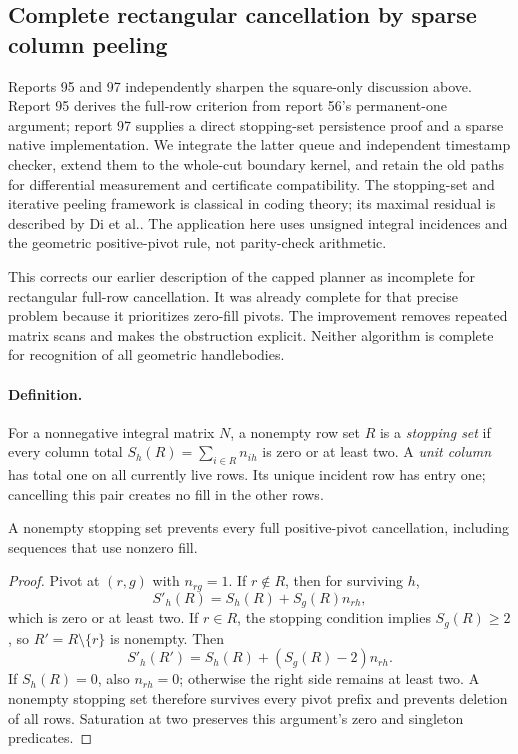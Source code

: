 \subsection{Complete rectangular cancellation by sparse column peeling}
\label{marked-cut:column-peeling}

Reports 95 and 97 independently sharpen the square-only discussion above.
Report 95 derives the full-row criterion from report 56's permanent-one
argument; report 97 supplies a direct stopping-set persistence proof and a
sparse native implementation. We integrate the latter queue and independent
timestamp checker, extend them to the whole-cut boundary kernel, and retain
the old paths for differential measurement and certificate compatibility.
The stopping-set and iterative peeling framework is classical in coding
theory; its maximal residual is described by Di et al.\cite{dptru2002}.
The application here uses unsigned integral incidences and the geometric
positive-pivot rule, not parity-check arithmetic.

This corrects our earlier description of the capped planner as incomplete
for rectangular full-row cancellation. It was already complete for that
precise problem because it prioritizes zero-fill pivots. The improvement
removes repeated matrix scans and makes the obstruction explicit. Neither
algorithm is complete for recognition of all geometric handlebodies.

\paragraph{Definition.}
For a nonnegative integral matrix $N$, a nonempty row set $R$ is a
\emph{stopping set} if every column total
$S_h(R)=\sum_{i\in R}n_{ih}$ is zero or at least two.
A \emph{unit column} has total one on all currently live rows.
Its unique incident row has entry one; cancelling this pair creates no fill
in the other rows.


\begin{proposition}
\label{marked-cut:stopping-persistence}
A nonempty stopping set prevents every full positive-pivot cancellation,
including sequences that use nonzero fill.
\end{proposition}
\begin{proof}
Pivot at $(r,g)$ with $n_{rg}=1$. If $r\notin R$, then for surviving $h$,
\[
 S'_h(R)=S_h(R)+S_g(R)n_{rh},
\]
which is zero or at least two. If $r\in R$, the stopping condition implies
$S_g(R)\ge2$, so $R'=R\setminus\{r\}$ is nonempty. Then
\[
 S'_h(R')=S_h(R)+(S_g(R)-2)n_{rh}.
\]
If $S_h(R)=0$, also $n_{rh}=0$; otherwise the right side remains at least
two. A nonempty stopping set therefore survives every pivot prefix and
prevents deletion of all rows. Saturation at two preserves this argument's
zero and singleton predicates.
\end{proof}

